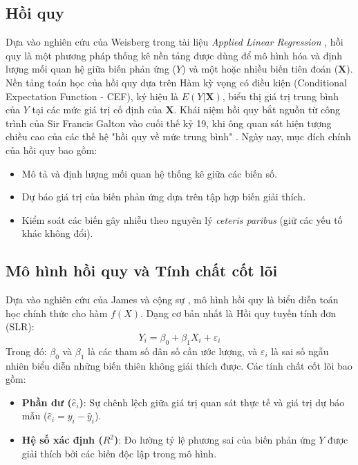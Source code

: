 	\subsection{Hồi quy}
	Dựa vào nghiên cứu của Weisberg trong tài liệu \textit{Applied Linear Regression} \cite{weisberg2014applied}, hồi quy là một phương pháp thống kê nền tảng được dùng để mô hình hóa và định lượng mối quan hệ giữa biến phản ứng ($Y$) và một hoặc nhiều biến tiên đoán ($\mathbf{X}$). Nền tảng toán học của hồi quy dựa trên Hàm kỳ vọng có điều kiện (Conditional Expectation Function - CEF), ký hiệu là $E(Y|\mathbf{X})$, biểu thị giá trị trung bình của $Y$ tại các mức giá trị cố định của $\mathbf{X}$. Khái niệm hồi quy bắt nguồn từ công trình của Sir Francis Galton vào cuối thế kỷ 19, khi ông quan sát hiện tượng chiều cao của các thế hệ "hồi quy về mức trung bình" \cite{galton1886}. Ngày nay, mục đích chính của hồi quy bao gồm:
	\begin{itemize}
		\item Mô tả và định lượng mối quan hệ thống kê giữa các biến số.
		\item Dự báo giá trị của biến phản ứng dựa trên tập hợp biến giải thích.
		\item Kiểm soát các biến gây nhiễu theo nguyên lý \textit{ceteris paribus} (giữ các yếu tố khác không đổi).
	\end{itemize}
	
	\subsection{Mô hình hồi quy và Tính chất cốt lõi}
	Dựa vào nghiên cứu của James và cộng sự \cite{james2013}, mô hình hồi quy là biểu diễn toán học chính thức cho hàm $f(X)$. Dạng cơ bản nhất là Hồi quy tuyến tính đơn (SLR):
	\begin{equation}
		Y_i = \beta_0 + \beta_1 X_i + \varepsilon_i
	\end{equation}
	Trong đó: $\beta_0$ và $\beta_1$ là các tham số dân số cần ước lượng, và $\varepsilon_i$ là sai số ngẫu nhiên biểu diễn những biến thiên không giải thích được. Các tính chất cốt lõi bao gồm:
	\begin{itemize}
		\item \textbf{Phần dư ($\hat{e}_i$)}: Sự chênh lệch giữa giá trị quan sát thực tế và giá trị dự báo mẫu ($\hat{e}_i = y_i - \hat{y}_i$).
		\item \textbf{Hệ số xác định ($R^2$)}: Đo lường tỷ lệ phương sai của biến phản ứng $Y$ được giải thích bởi các biến độc lập trong mô hình.
	\end{itemize}
	
